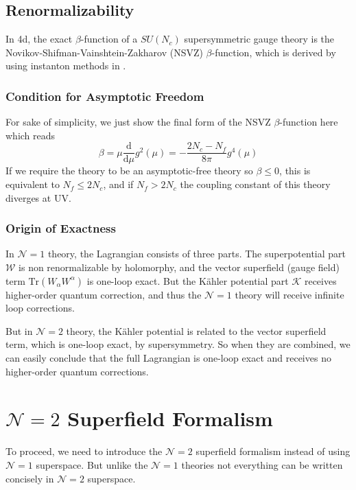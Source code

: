 \documentclass{article}
\begin{document}
\subsection{Renormalizability}
In 4d, the exact $\beta$-function of a $SU(N_c)$ supersymmetric gauge theory is the Novikov-Shifman-Vainshtein-Zakharov (NSVZ) $\beta$-function, which is derived by using instanton methods in \cite{NSVZ1,NSVZ2}. 

\subsubsection{Condition for Asymptotic Freedom}
 For sake of simplicity, we just show the final form of the NSVZ $\beta$-function here which reads 
\begin{equation}
\beta=\mu\frac{\mathrm{d}}{\mathrm{d}\mu}g^2(\mu)=-\frac{2N_c-N_f}{8\pi}g^4(\mu)
\end{equation}
If we require the theory to be an asymptotic-free theory so $\beta \leq 0$, this is equivalent to $N_f \leq 2N_c$, and if $N_f > 2N_c$ the coupling constant of this theory diverges at UV. 

\subsubsection{Origin of Exactness}
In $\mathcal{N}=1$ theory, the Lagrangian consists of three parts. The superpotential part $\mathcal{W}$ is non renormalizable by holomorphy, and the vector superfield (gauge field) term $\mathrm{Tr}(W_\alpha W^\alpha)$ is one-loop exact. But the K\"{a}hler potential part $\mathcal{K}$ receives higher-order quantum correction, and thus the $\mathcal{N}=1$ theory will receive infinite loop corrections. 

But in $\mathcal{N}=2$ theory, the K\"{a}hler potential is related to the vector superfield term, which is one-loop exact, by supersymmetry. So when they are combined, we can easily conclude that the full Lagrangian is one-loop exact and receives no higher-order quantum corrections.

\section{$\mathcal{N}=2$ Superfield Formalism}
To proceed, we need to introduce the $\mathcal{N}=2$ superfield formalism instead of using $\mathcal{N}=1$ superspace. But unlike the $\mathcal{N}=1$ theories not everything can be written concisely in $\mathcal{N}=2$ superspace.
\end{document}
